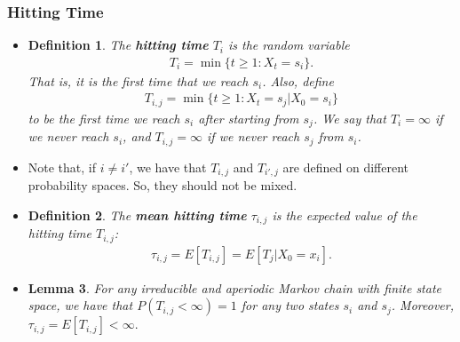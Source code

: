\documentclass[10pt]{article}
\newtheorem{lemma}{Lemma}
\newtheorem{definition}[lemma]{Definition}
\begin{document}
\subsubsection{Hitting Time}

\begin{itemize}
  \item \begin{definition}
    The {\bf hitting time} $T_{i}$ is the random variable
    \begin{align*}
        T_{i} = \min\{t \geq 1 : X_t = s_i \}.
    \end{align*}        
    That is, it is the first time that we reach $s_i$. Also, define 
    \begin{align*}
        T_{i,j} = \min\{ t \geq 1 : X_t = s_j | X_0 = s_i \}
    \end{align*}
    to be the first time we reach $s_i$ after starting from $s_j$.
    We say that $T_i = \infty$ if we never reach $s_i$, and $T_{i,j} = \infty$ if we never reach $s_j$ from $s_i$.
  \end{definition}

  \item Note that, if $i \neq i'$, we have that $T_{i,j}$ and $T_{i',j}$ are defined on different probability spaces. So, they should not be mixed.
  
  \item \begin{definition}
    The {\bf mean hitting time} $\tau_{i,j}$ is the expected value of the hitting time $T_{i,j}$:
    \begin{align*}
        \tau_{i,j} = E[T_{i,j}] = E[T_j | X_0 = x_i ].
    \end{align*}
  \end{definition}

  \item \begin{lemma} \label{lemma:tau-is-finite}
    For any irreducible and aperiodic Markov chain with finite state space, we have that $P(T_{i,j} < \infty) = 1$ for any two states $s_i$ and $s_j$. Moreover, $\tau_{i,j} = E[T_{i,j}] < \infty.$
  \end{lemma}


\end{itemize}
\end{document}
